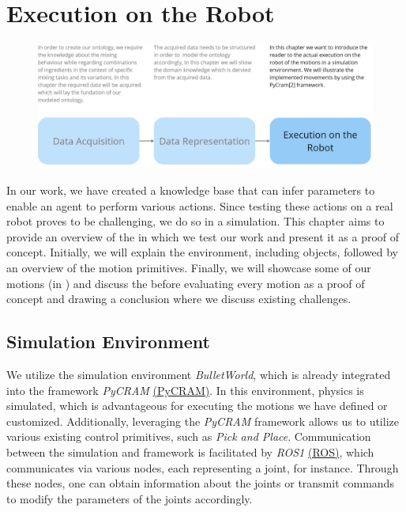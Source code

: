 \chapter{Execution on the Robot}
\label{chap:Execution on the robot}
\begin{figure}[H]
    \includegraphics[scale=0.25]{Graphics/structure_overview3.jpg}
\end{figure}
In our work, we have created a knowledge base that can infer parameters to enable an agent to perform various actions.
Since testing these actions on a real robot proves to be challenging, we do so in a simulation.
This chapter aims to provide an overview of the  in which we test our work and present it as a proof of concept.
Initially, we will explain the environment, including objects, followed by an overview of the motion primitives.
Finally, we will showcase some of our motions (in ) and discuss the  before evaluating every motion as a proof of concept and drawing a conclusion where we discuss existing challenges.

\section{Simulation Environment}
\label{sec:simulation environment}

We utilize the simulation environment \textit{BulletWorld}, which is already integrated into the framework \textit{PyCRAM} \hyperref[sec:pycram]{(PyCRAM)}. In this environment, physics is simulated, which is advantageous for executing the motions we have defined or customized. Additionally, leveraging the \textit{PyCRAM} framework allows us to utilize various existing control primitives, such as \textit{Pick and Place}. Communication between the simulation and framework is facilitated by \textit{ROS1} \hyperref[sec:ROS]{(ROS)}, which communicates via various nodes, each representing a joint, for instance. Through these nodes, one can obtain information about the joints or transmit commands to modify the parameters of the joints accordingly.


